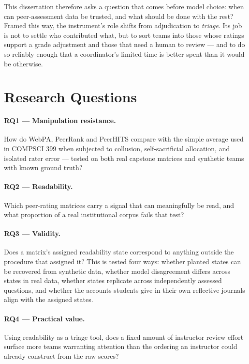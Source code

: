 This dissertation therefore asks a question that comes before model choice: when can peer-assessment data be trusted, and what should be done with the rest? Framed this way, the instrument's role shifts from adjudication to \emph{triage}. Its job is not to settle who contributed what, but to sort teams into those whose ratings support a grade adjustment and those that need a human to review — and to do so reliably enough that a coordinator's limited time is better spent than it would be otherwise.

\section{Research Questions}
\label{sec:rqs}

\paragraph{RQ1 --- Manipulation resistance.} How do WebPA, PeerRank and PeerHITS compare with the simple average used in COMPSCI 399 when subjected to collusion, self-sacrificial allocation, and isolated rater error — tested on both real capstone matrices and synthetic teams with known ground truth?

\paragraph{RQ2 --- Readability.} Which peer-rating matrices carry a signal that can meaningfully be read, and what proportion of a real institutional corpus fails that test?

\paragraph{RQ3 --- Validity.} Does a matrix's assigned readability state correspond to anything outside the procedure that assigned it? This is tested four ways: whether planted states can be recovered from synthetic data, whether model disagreement differs across states in real data, whether states replicate across independently assessed questions, and whether the accounts students give in their own reflective journals align with the assigned states.

\paragraph{RQ4 --- Practical value.} Using readability as a triage tool, does a fixed amount of instructor review effort surface more teams warranting attention than the ordering an instructor could already construct from the raw scores?
